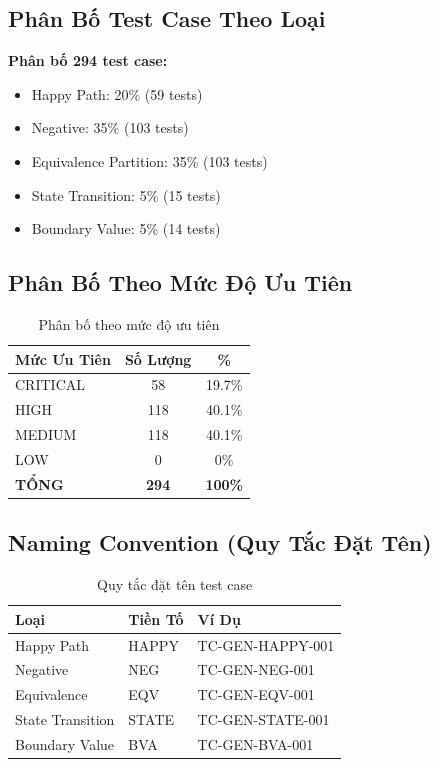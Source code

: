 \documentclass[12pt, a4paper]{article}
\begin{document}
\subsection{Phân Bố Test Case Theo Loại}

\textbf{Phân bố 294 test case:}
\begin{itemize}
    \item Happy Path: 20\% (59 tests)
    \item Negative: 35\% (103 tests)
    \item Equivalence Partition: 35\% (103 tests)
    \item State Transition: 5\% (15 tests)
    \item Boundary Value: 5\% (14 tests)
\end{itemize}

\subsection{Phân Bố Theo Mức Độ Ưu Tiên}

\begin{table}[h]
\centering
\begin{tabular}{|l|c|c|}
\hline
\textbf{Mức Ưu Tiên} & \textbf{Số Lượng} & \textbf{\%} \\
\hline
CRITICAL & 58 & 19.7\% \\
HIGH & 118 & 40.1\% \\
MEDIUM & 118 & 40.1\% \\
LOW & 0 & 0\% \\
\hline
\textbf{TỔNG} & \textbf{294} & \textbf{100\%} \\
\hline
\end{tabular}
\caption{Phân bố theo mức độ ưu tiên}
\end{table}

\subsection{Naming Convention (Quy Tắc Đặt Tên)}

\begin{table}[h]
\centering
\begin{tabular}{|l|l|l|}
\hline
\textbf{Loại} & \textbf{Tiền Tố} & \textbf{Ví Dụ} \\
\hline
Happy Path & HAPPY & TC-GEN-HAPPY-001 \\
Negative & NEG & TC-GEN-NEG-001 \\
Equivalence & EQV & TC-GEN-EQV-001 \\
State Transition & STATE & TC-GEN-STATE-001 \\
Boundary Value & BVA & TC-GEN-BVA-001 \\
\hline
\end{tabular}
\caption{Quy tắc đặt tên test case}
\end{table}
\end{document}
